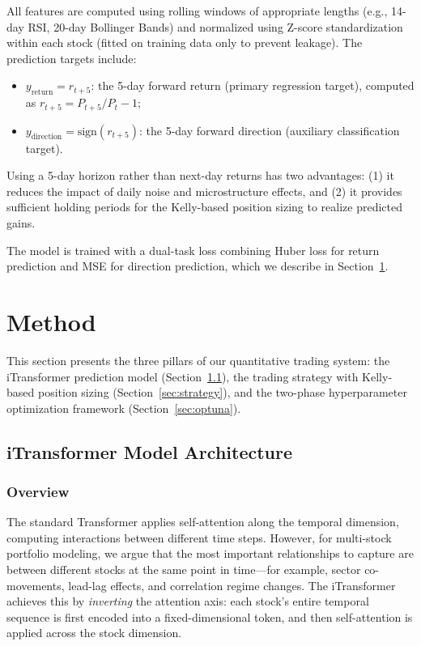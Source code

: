\documentclass[12pt, a4paper]{article}
\begin{document}
All features are computed using rolling windows of appropriate lengths (e.g., 14-day RSI, 20-day Bollinger Bands) and normalized using Z-score standardization within each stock (fitted on training data only to prevent leakage). The prediction targets include:
\begin{itemize}[leftmargin=2em]
    \item $y_{\text{return}} = r_{t+5}$: the 5-day forward return (primary regression target), computed as $r_{t+5} = P_{t+5}/P_t - 1$;
    \item $y_{\text{direction}} = \text{sign}(r_{t+5})$: the 5-day forward direction (auxiliary classification target).
\end{itemize}

Using a 5-day horizon rather than next-day returns has two advantages: (1) it reduces the impact of daily noise and microstructure effects, and (2) it provides sufficient holding periods for the Kelly-based position sizing to realize predicted gains.

The model is trained with a dual-task loss combining Huber loss for return prediction and MSE for direction prediction, which we describe in Section~\ref{sec:method}.

\section{Method} \label{sec:method}

This section presents the three pillars of our quantitative trading system: the iTransformer prediction model (Section~\ref{sec:model}), the trading strategy with Kelly-based position sizing (Section~\ref{sec:strategy}), and the two-phase hyperparameter optimization framework (Section~\ref{sec:optuna}).

\subsection{iTransformer Model Architecture} \label{sec:model}

\subsubsection{Overview}

The standard Transformer applies self-attention along the temporal dimension, computing interactions between different time steps. However, for multi-stock portfolio modeling, we argue that the most important relationships to capture are between different stocks at the same point in time---for example, sector co-movements, lead-lag effects, and correlation regime changes. The iTransformer \citep{liu2024itransformer} achieves this by \emph{inverting} the attention axis: each stock's entire temporal sequence is first encoded into a fixed-dimensional token, and then self-attention is applied across the stock dimension.
\end{document}

